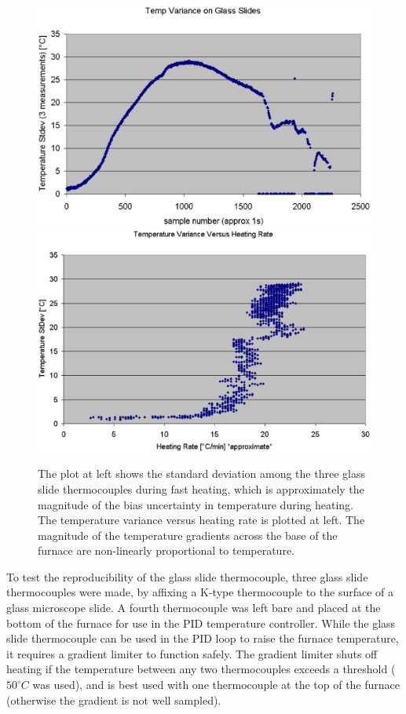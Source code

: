 \documentclass[12pt,oneside,english]{article}
\begin{document}
	\begin{figure}
		\includegraphics[width=140mm]{images/heating_data.eps}
		\includegraphics[width=140mm]{images/variance_vs_rate.eps}
		\caption{The plot at left shows the standard deviation among the three glass slide thermocouples during fast heating, which is approximately the magnitude of the bias uncertainty in temperature during heating.  The temperature variance versus heating rate is plotted at left.  The magnitude of the temperature gradients across the base of the furnace are non-linearly proportional to temperature.}
	\end{figure}
	
	To test the reproducibility of the glass slide thermocouple, three glass slide thermocouples were made, by affixing a K-type thermocouple to the surface of a glass microscope slide.
	A fourth thermocouple was left bare and placed at the bottom of the furnace for use in the PID temperature controller.
	While the glass slide thermocouple can be used in the PID loop to raise the furnace temperature, it requires a gradient limiter to function safely.  
	The gradient limiter shuts off heating if the temperature between any two thermocouples exceeds a threshold ($50^{\circ}C$ was used), and is best used with one thermocouple at the top of the furnace (otherwise the gradient is not well sampled).
\end{document}
